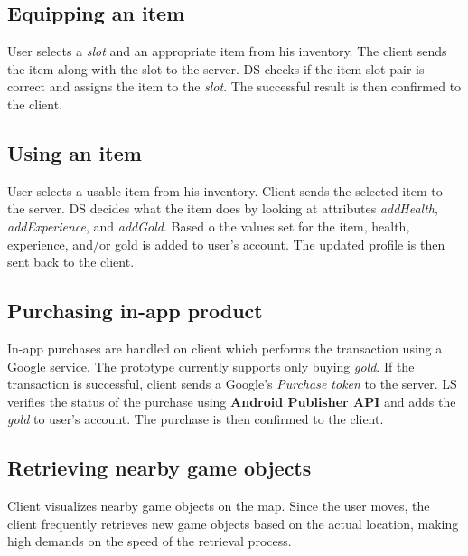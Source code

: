 	\subsection{Equipping an item}
	User selects a \textit{slot} and an appropriate item from his inventory. The client sends the item along with the slot to the server. DS checks if the item-slot pair is correct and assigns the item to the \textit{slot}. The successful result is then confirmed to the client.
	
	\subsection{Using an item}
	User selects a usable item from his inventory. Client sends the selected item to the server. DS decides what the item does by looking at attributes \textit{addHealth}, \textit{addExperience}, and \textit{addGold}. Based o the values set for the item, health, experience, and/or gold is added to user's account. The updated profile is then sent back to the client.
		
	\subsection{Purchasing in-app product}
	In-app purchases are handled on client which performs the transaction using a Google service. The prototype currently supports only buying \textit{gold}. If the transaction is successful, client sends a Google's \textit{Purchase token} to the server. LS verifies the status of the purchase using \textbf{Android Publisher API} \cite{androidpublisher} and adds the \textit{gold} to user's account. The purchase is then confirmed to the client.

	\subsection{Retrieving nearby game objects}
	Client visualizes nearby game objects on the map. Since the user moves, the client frequently retrieves new game objects based on the actual location, making high demands on the speed of the retrieval process.
	
